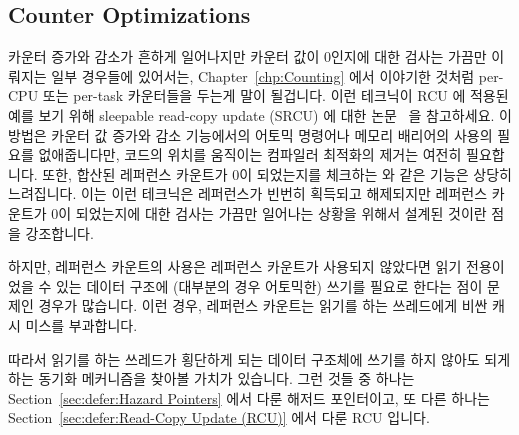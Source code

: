 \subsection{Counter Optimizations}
\label{sec:together:Counter Optimizations}

카운터 증가와 감소가 흔하게 일어나지만 카운터 값이 0인지에 대한 검사는 가끔만
이뤄지는 일부 경우들에 있어서는,
Chapter~\ref{chp:Counting} 에서 이야기한 것처럼 per-CPU 또는 per-task
카운터들을 두는게 말이 될겁니다.
이런 테크닉이 RCU 에 적용된 예를 보기 위해 sleepable read-copy update (SRCU) 에
대한 논문~\cite{PaulEMcKenney2006c} 을 참고하세요.
이 방법은 카운터 값 증가와 감소 기능에서의 어토믹 명령어나 메모리 배리어의
사용의 필요를 없애줍니다만, 코드의 위치를 움직이는 컴파일러 최적화의 제거는
여전히 필요합니다.
또한, 합산된 레퍼런스 카운트가 0이 되었는지를 체크하는 
와 같은 기능은 상당히 느려집니다.
이는 이런 테크닉은 레퍼런스가 빈번히 획득되고 해제되지만 레퍼런스 카운트가 0이
되었는지에 대한 검사는 가끔만 일어나는 상황을 위해서 설계된 것이란 점을
강조합니다.
\iffalse

In some cases where increments and decrements are common, but checks
for zero are rare, it makes sense to maintain per-CPU or per-task
counters, as was discussed in Chapter~\ref{chp:Counting}.
See the paper on sleepable read-copy update
(SRCU) for an example of this technique applied to
RCU~\cite{PaulEMcKenney2006c}.
This approach eliminates the need for atomic instructions or memory
barriers on the increment and decrement primitives, but still requires
that code-motion compiler optimizations be disabled.
In addition, the primitives such as \co{synchronize_srcu()}
that check for the aggregate reference
count reaching zero can be quite slow.
This underscores the fact that these techniques are designed
for situations where the references are frequently acquired and
released, but where it is rarely necessary to check for a zero
reference count.
\fi


하지만, 레퍼런스 카운트의 사용은 레퍼런스 카운트가 사용되지 않았다면 읽기
전용이었을 수 있는 데이터 구조에 (대부분의 경우 어토믹한) 쓰기를 필요로 한다는
점이 문제인 경우가 많습니다.
이런 경우, 레퍼런스 카운트는 읽기를 하는 쓰레드에게 비싼 캐시 미스를
부과합니다.

따라서 읽기를 하는 쓰레드가 횡단하게 되는 데이터 구조체에 쓰기를 하지 않아도
되게 하는 동기화 메커니즘을 찾아볼 가치가 있습니다.
그런 것들 중 하나는
Section~\ref{sec:defer:Hazard Pointers} 에서 다룬 해저드 포인터이고, 또 다른
하나는
Section~\ref{sec:defer:Read-Copy Update (RCU)} 에서 다룬 RCU 입니다.
\iffalse

However, it is usually the case that use of reference counts requires
writing (often atomically) to a data structure that is otherwise
read only.
In this case, reference counts are imposing expensive cache misses
on readers.

It is therefore worthwhile to look into synchronization mechanisms
that do not require readers to write to the data structure being
traversed.
One possibility is the hazard pointers covered in
Section~\ref{sec:defer:Hazard Pointers}
and another is RCU, which is covered in
Section~\ref{sec:defer:Read-Copy Update (RCU)}.
\fi
